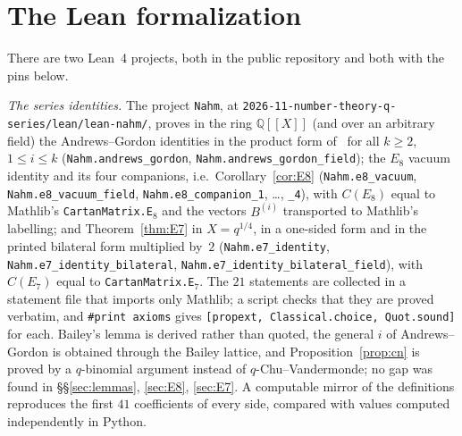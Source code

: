 \documentclass[11pt]{amsart}
\theoremstyle{definition}
\numberwithin{equation}{section}
\newcommand{\Q}{\mathbb{Q}}
\newcommand{\repo}{\nolinkurl{2026-11-number-theory-q-series/}}
\newcommand{\fpath}[1]{\nolinkurl{#1}}
\begin{document}
\section{The Lean formalization}\label{sec:lean}

There are two Lean~4 projects, both in the public repository and both with the pins below.

\emph{The series identities.} The project \fpath{Nahm}, at \repo\fpath{lean/lean-nahm/}, proves in the
ring $\Q[[X]]$ (and over an arbitrary field) the Andrews--Gordon identities in the product form
of~\cite[Theorem~1]{Andrews74} for all $k\ge2$, $1\le i\le k$ (\texttt{Nahm.andrews\_gordon},
\texttt{Nahm.andrews\_gordon\_field}); the $E_8$ vacuum identity and its four companions, i.e.\
Corollary~\ref{cor:E8} (\texttt{Nahm.e8\_vacuum}, \texttt{Nahm.e8\_vacuum\_field},
\texttt{Nahm.e8\_companion\_1}, \dots, \texttt{\_4}), with $C(E_8)$ equal to Mathlib's
\texttt{CartanMatrix.E}$_8$ and the vectors $B^{(i)}$ transported to Mathlib's labelling; and
Theorem~\ref{thm:E7} in $X=q^{1/4}$, in a one-sided form and in the printed bilateral form multiplied by~$2$
(\texttt{Nahm.e7\_identity}, \texttt{Nahm.e7\_identity\_bilateral}, \texttt{Nahm.e7\_identity\_bilateral\_field}),
with $C(E_7)$ equal to \texttt{CartanMatrix.E}$_7$. The $21$ statements are collected in a statement file
that imports only Mathlib; a script checks that they are proved verbatim, and \verb|#print axioms| gives
\texttt{[propext, Classical.choice, Quot.sound]} for each. Bailey's lemma is derived rather than quoted, the
general $i$ of Andrews--Gordon is obtained through the Bailey lattice, and Proposition~\ref{prop:cn} is proved
by a $q$-binomial argument instead of $q$-Chu--Vandermonde; no gap was found in §§\ref{sec:lemmas},
\ref{sec:E8}, \ref{sec:E7}. A computable mirror of the definitions reproduces the first $41$ coefficients
of every side, compared with values computed independently in Python.
\end{document}
